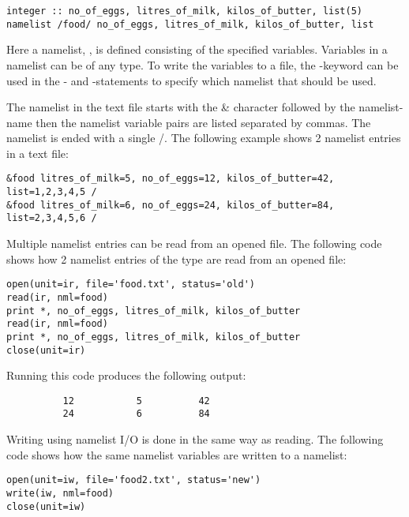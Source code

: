 \begin{lstlisting}
integer :: no_of_eggs, litres_of_milk, kilos_of_butter, list(5)
namelist /food/ no_of_eggs, litres_of_milk, kilos_of_butter, list
\end{lstlisting}

Here a namelist, , is defined consisting of the specified variables. Variables in a namelist can be of any type. To write the variables to a file, the -keyword can be used in the - and -statements to specify which namelist that should be used. 

The namelist in the text file starts with the \& character followed by the namelist-name then the namelist variable pairs are listed separated by commas. The namelist is ended with a single /. The following example shows 2 namelist entries in a text file:

\begin{lstlisting}
&food litres_of_milk=5, no_of_eggs=12, kilos_of_butter=42, list=1,2,3,4,5 /
&food litres_of_milk=6, no_of_eggs=24, kilos_of_butter=84, list=2,3,4,5,6 /
\end{lstlisting}

Multiple namelist entries can be read from an opened file. The following code shows how 2 namelist entries of the type  are read from an opened file:

\begin{lstlisting}
open(unit=ir, file='food.txt', status='old')
read(ir, nml=food)
print *, no_of_eggs, litres_of_milk, kilos_of_butter
read(ir, nml=food)
print *, no_of_eggs, litres_of_milk, kilos_of_butter
close(unit=ir)
\end{lstlisting}

Running this code produces the following output:

\cmdmode

\begin{lstlisting}
          12           5          42
          24           6          84
\end{lstlisting}

\fmode

Writing using namelist I/O is done in the same way as reading. The following code shows how the same namelist variables are written to a namelist:

\begin{lstlisting}
open(unit=iw, file='food2.txt', status='new')
write(iw, nml=food)
close(unit=iw)
\end{lstlisting}

